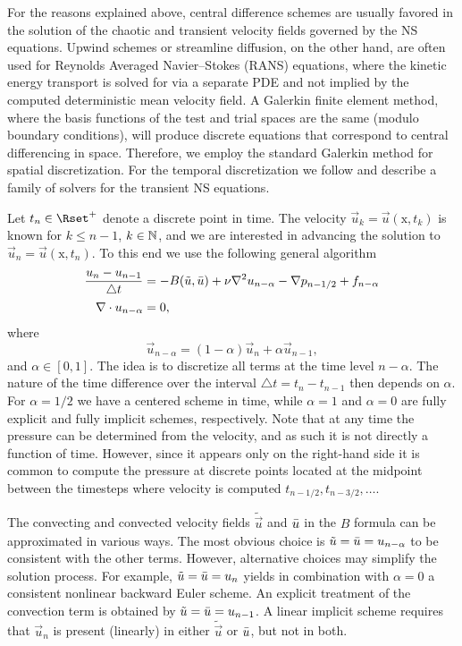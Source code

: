 For the reasons explained above, central difference schemes are usually
favored in the solution of the chaotic and transient velocity fields
governed by the NS equations. Upwind schemes or streamline diffusion,
on the other hand, are often used for Reynolds Averaged Navier--Stokes
(RANS) equations, where the kinetic energy transport is solved for
via a separate PDE and not implied by the computed deterministic mean
velocity field. A Galerkin finite element method, where the basis
functions of the test and trial spaces are the same (modulo boundary
conditions), will produce discrete equations that correspond to central
differencing in space. Therefore, we employ the standard Galerkin method
for spatial discretization. For the temporal discretization we follow
\citet{SimoArmero1994} and describe a family of solvers for the transient
NS equations.

Let $t_n \in \Rset^{+}$ denote a discrete point in time. The velocity
$\vec{u}_k=\vec{u}(\text{x},t_k)$ is known for $k\leqslant n-1$, $k \in
\Nset$, and we are interested in advancing the solution to
$\vec{u}_{n}=\vec{u}(\text{x},t_{n})$.
To this end we use the
following general algorithm
\begin{align}
\label{eq:mortensen:NS_d}
    \frac{\vec{u}_{n}-\vec{u}_{n-1}}{\triangle t}
      &= - B(\tilde{\vec{u}},\Bar{\vec{u}})
          + \nu \nabla^2 \vec{u}_{n-\alpha}
        -\nabla p_{n-1/2} + f_{n-\alpha}
\\
 \label{eq:mortensen:cont_d}
    \nabla \cdot \vec{u}_{n-\alpha} &= 0,
\end{align}
where
\begin{equation}
   \vec{u}_{n-\alpha}=(1-\alpha) \vec{u}_{n} + \alpha \vec{u}_{n-1},
\end{equation}
and $\alpha \in [0, 1]$.  The idea is to discretize all terms at the
time level $n-\alpha$. The nature of the time difference over the interval
$\triangle t = t_n - t_{n-1}$ then depends on $\alpha$. For $\alpha =1/2$
we have a centered scheme
in time, while $\alpha =1$ and $\alpha=0$ are fully explicit and fully
implicit schemes, respectively. Note that at any time the pressure can be
determined from the velocity, and as such it is not directly a function
of time. However, since it appears only on the right-hand side it is
common to compute the pressure at discrete points located at the
midpoint between the timesteps where velocity is computed
$t_{n-1/2}, t_{n-3/2}, \ldots$.

The convecting and convected velocity fields
$\tilde{\vec{u}}$ and $\Bar{\vec{u}}$ in the $B$ formula can
be approximated in various ways. The most obvious choice is
$\tilde{\vec{u}}=\Bar{\vec{u}}=\vec{u}_{n-\alpha}$ to be consistent with
the other terms. However, alternative choices may simplify the solution
process. For example, $\tilde{\vec{u}}=\Bar{\vec{u}}=\vec{u}_{n}$ yields
in combination with $\alpha=0$ a consistent nonlinear backward Euler
scheme. An explicit treatment of the convection term is obtained by
$\tilde{\vec{u}} = \Bar{\vec{u}} = \vec{u}_{n-1}$.  A linear implicit
scheme requires that $\vec{u}_{n}$ is present (linearly) in either
$\tilde{\vec{u}}$ or $\Bar{\vec{u}}$, but not in both.

